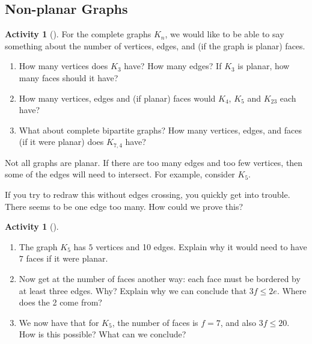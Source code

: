 \documentclass[10pt,]{book}
\theoremstyle{plain}
\theoremstyle{definition}
\theoremstyle{definition}
\theoremstyle{definition}
\newtheorem{activity}[project]{Activity}
\numberwithin{equation}{chapter}
\newcommand{\vtx}[2]{node[fill,circle,inner sep=0pt, minimum size=4pt,label=#1:#2]{}}
\renewcommand{\v}{\vtx{above}{}}
\begin{document}
\subsection[{Non-planar Graphs}]{Non-planar Graphs}\label{subsection-39}
\begin{activity}[]\label{activity-286}
\hypertarget{p-1510}{}%
For the complete graphs \(K_n\), we would like to be able to say something about the number of vertices, edges, and (if the graph is planar) faces.%
\begin{enumerate}[font=\bfseries,label=(\alph*),ref=\alph*]
\item\label{task-253} \hypertarget{p-1511}{}%
How many vertices does \(K_3\) have? How many edges?  If \(K_3\) is planar, how many faces should it have?%
\item\label{task-254} \hypertarget{p-1512}{}%
How many vertices, edges and (if planar) faces would \(K_4\), \(K_5\) and \(K_{23}\) each have?%
\item\label{task-255} \hypertarget{p-1513}{}%
What about complete bipartite graphs? How many vertices, edges, and faces (if it were planar) does \(K_{7,4}\) have?%
\end{enumerate}
\end{activity}
\hypertarget{p-1514}{}%
Not all graphs are planar. If there are too many edges and too few vertices, then some of the edges will need to intersect. For example, consider \(K_5\).%
\begin{sidebyside}{1}{0.4}{0.4}{0}
\begin{sbspanel}{0.2}
\resizebox{\linewidth}{!}{{
\begin{tikzpicture}
          \foreach \x in {0,...,4}
          \draw (\x*72+18:1) \v -- (\x*72+90:1) -- (\x*72-54:1);
        \end{tikzpicture}
}
}
\end{sbspanel}
\end{sidebyside}
\par
\hypertarget{p-1515}{}%
If you try to redraw this without edges crossing, you quickly get into trouble. There seems to be one edge too many. How could we prove this?%
\begin{activity}[]\label{activity-287}
\leavevmode%
\begin{enumerate}[font=\bfseries,label=(\alph*),ref=\alph*]
\item\label{task-256} \hypertarget{p-1516}{}%
The graph \(K_5\) has \(5\) vertices and 10 edges.  Explain why it would need to have \(7\) faces if it were planar.%
\item\label{task-257} \hypertarget{p-1518}{}%
Now get at the number of faces another way: each face must be bordered by at least three edges.  Why?  Explain why we can conclude that \(3f \le 2e\).  Where does the 2 come from?%
\item\label{task-258} \hypertarget{p-1520}{}%
We now have that for \(K_5\), the number of faces is \(f = 7\), and also \(3f \le 20\).  How is this possible?  What can we conclude?%
\end{enumerate}
\end{activity}
\end{document}
